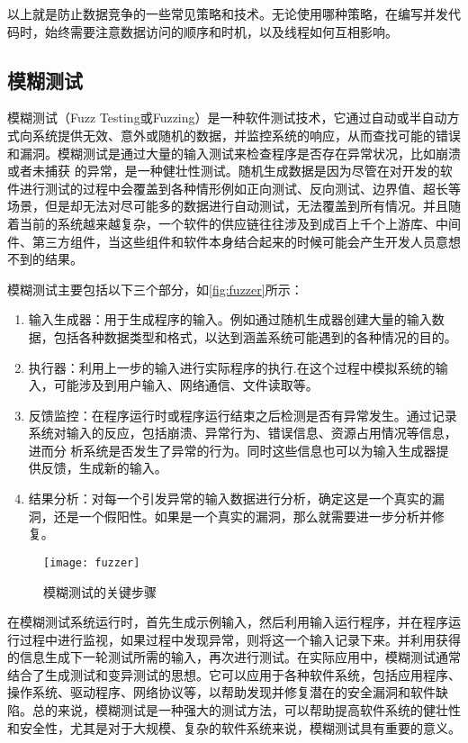 以上就是防止数据竞争的一些常见策略和技术。无论使用哪种策略，在编写并发代码时，始终需要注意数据访问的顺序和时机，以及线程如何互相影响。

\subsection{模糊测试}
\label{fuzzing}

模糊测试\cite{sutton2007fuzzing, manes2018fuzzing}（Fuzz Testing或Fuzzing）是一种软件测试技术，它通过自动或半自动方式向系统提供无效、意外或随机的数据，并监控系统的响应，从而查找可能的错误和漏洞。模糊测试是通过大量的输入测试来检查程序是否存在异常状况，比如崩溃或者未捕获 的异常，是一种健壮性测试。随机生成数据是因为尽管在对开发的软件进行测试的过程中会覆盖到各种情形例如正向测试、反向测试、边界值、超长等场景，但是却无法对尽可能多的数据进行自动测试，无法覆盖到所有情况。并且随着当前的系统越来越复杂，一个软件的供应链往往涉及到成百上千个上游库、中间件、第三方组件，当这些组件和软件本身结合起来的时候可能会产生开发人员意想不到的结果。

模糊测试主要包括以下三个部分，如\autoref{fig:fuzzer}所示：

\begin{enumerate}
\item 输入生成器：用于生成程序的输入。例如通过随机生成器创建大量的输入数据，包括各种数据类型和格式，以达到涵盖系统可能遇到的各种情况的目的。
\item 执行器：利用上一步的输入进行实际程序的执行.在这个过程中模拟系统的输入，可能涉及到用户输入、网络通信、文件读取等。
\item 反馈监控：在程序运行时或程序运行结束之后检测是否有异常发生。通过记录系统对输入的反应，包括崩溃、异常行为、错误信息、资源占用情况等信息，进而分 析系统是否发生了异常的行为。同时这些信息也可以为输入生成器提供反馈，生成新的输入。
\item 结果分析：对每一个引发异常的输入数据进行分析，确定这是一个真实的漏洞，还是一个假阳性。如果是一个真实的漏洞，那么就需要进一步分析并修复。
\end{enumerate}

\begin{figure}[ht]
    \centering
    \texttt{[image: fuzzer]}
    \caption{\label{fig:fuzzer}模糊测试的关键步骤\cite{zhu2022fuzzing}}
\end{figure}


在模糊测试系统运行时，首先生成示例输入，然后利用输入运行程序，并在程序运行过程中进行监视，如果过程中发现异常，则将这一个输入记录下来。并利用获得的信息生成下一轮测试所需的输入，再次进行测试。在实际应用中，模糊测试通常结合了生成测试和变异测试的思想。它可以应用于各种软件系统，包括应用程序、操作系统、驱动程序、网络协议等，以帮助发现并修复潜在的安全漏洞和软件缺陷。总的来说，模糊测试是一种强大的测试方法，可以帮助提高软件系统的健壮性和安全性，尤其是对于大规模、复杂的软件系统来说，模糊测试具有重要的意义。

